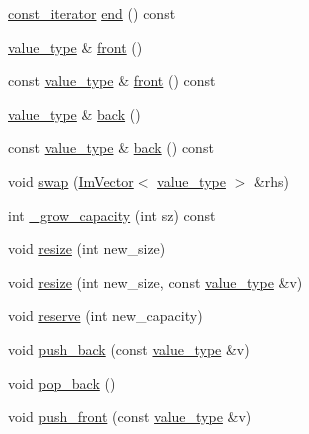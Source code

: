 \begin{DoxyCompactItemize}
\item 
\mbox{\hyperlink{class_im_vector_aedeac9c5080f9d6ce96ae837768ee4c4}{const\+\_\+iterator}} \mbox{\hyperlink{class_im_vector_a06efa87357864d1c130f0f400eeccf8d}{end}} () const
\item 
\mbox{\hyperlink{class_im_vector_a8bd77e4e7581d8e5f9e98d7c2f3c2a80}{value\+\_\+type}} \& \mbox{\hyperlink{class_im_vector_a5b0108d6b1a4a11609723f8305fb9011}{front}} ()
\item 
const \mbox{\hyperlink{class_im_vector_a8bd77e4e7581d8e5f9e98d7c2f3c2a80}{value\+\_\+type}} \& \mbox{\hyperlink{class_im_vector_a76dc6bb045574ba79b15a1941b662597}{front}} () const
\item 
\mbox{\hyperlink{class_im_vector_a8bd77e4e7581d8e5f9e98d7c2f3c2a80}{value\+\_\+type}} \& \mbox{\hyperlink{class_im_vector_a3e4424d3fca190894598a6575f9d2401}{back}} ()
\item 
const \mbox{\hyperlink{class_im_vector_a8bd77e4e7581d8e5f9e98d7c2f3c2a80}{value\+\_\+type}} \& \mbox{\hyperlink{class_im_vector_a6f22918d4f139a1c4c3410ccae726f81}{back}} () const
\item 
void \mbox{\hyperlink{class_im_vector_ac7f0862107eb88349d17f9a2e147deaa}{swap}} (\mbox{\hyperlink{class_im_vector}{Im\+Vector}}$<$ \mbox{\hyperlink{class_im_vector_a8bd77e4e7581d8e5f9e98d7c2f3c2a80}{value\+\_\+type}} $>$ \&rhs)
\item 
int \mbox{\hyperlink{class_im_vector_a3a097635d464b1b70dc7d59996a88b28}{\+\_\+grow\+\_\+capacity}} (int sz) const
\item 
void \mbox{\hyperlink{class_im_vector_ac371dd62e56ae486b1a5038cf07eee56}{resize}} (int new\+\_\+size)
\item 
void \mbox{\hyperlink{class_im_vector_a1ea8f92d2e1c48772b3765b76a46c543}{resize}} (int new\+\_\+size, const \mbox{\hyperlink{class_im_vector_a8bd77e4e7581d8e5f9e98d7c2f3c2a80}{value\+\_\+type}} \&v)
\item 
void \mbox{\hyperlink{class_im_vector_a0f14f5736c3372157856eebb67123b75}{reserve}} (int new\+\_\+capacity)
\item 
void \mbox{\hyperlink{class_im_vector_a68387993f2a5f5c3b2a7139d9ab778b8}{push\+\_\+back}} (const \mbox{\hyperlink{class_im_vector_a8bd77e4e7581d8e5f9e98d7c2f3c2a80}{value\+\_\+type}} \&v)
\item 
void \mbox{\hyperlink{class_im_vector_a3db7ce62d3c429effdb893fbf7148c1c}{pop\+\_\+back}} ()
\item 
void \mbox{\hyperlink{class_im_vector_a9a21cfec59d057cba605da14682180d2}{push\+\_\+front}} (const \mbox{\hyperlink{class_im_vector_a8bd77e4e7581d8e5f9e98d7c2f3c2a80}{value\+\_\+type}} \&v)

\end{DoxyCompactItemize}

